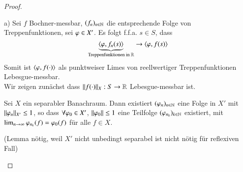 \begin{proof}
    \begin{description}
        \item{a)}
        Sei $f$ Bochner-messbar, $(f_n)_{n\in\mathbb{N}}$ die entsprechende Folge von Treppenfunktionen, sei
        $\varphi \in X'$. Es folgt f.f.a. $s\in S$, dass
        \[
            \underbrace{\langle \varphi, f_n(s)\rangle}_{\text{Treppenfunktionen in $\mathbb{R}$}} \rightarrow \langle \varphi , f(s)\rangle
        \]
        Somit ist $\langle \varphi, f(\cdot)\rangle$ als punktweiser Limes von reellwertiger Treppenfunktionen 
        Lebesgue-messbar.
        \\[.5cm]
        Wir zeigen zunächst dass $\|f(\cdot)\|_X: S\rightarrow \mathbb{R}$ Lebesgue-messbar ist.

        \begin{lem}\label{27}
            Sei $X$ ein separabler Banachraum. Dann existiert $(\varphi_n)_{n\in \mathbb{N}}$ eine Folge in $X'$ mit
            $\|\varphi _n\|_{X'}\leq 1$, so dass $\forall \varphi_0\in X'$, $\|\varphi_0\|\leq 1$ eine Teilfolge
            $(\varphi_{n_k})_{k\in\mathbb{N}}$ existiert, mit $\lim_{n\rightarrow \infty}\varphi_{n_k}(f)=\varphi_0(f)$ für alle 
            $f\in X$.
        \end{lem}
        (Lemma nötig, weil $X'$ nicht unbedingt separabel ist nicht nötig für reflexiven Fall)


\end{description}
\end{proof}

